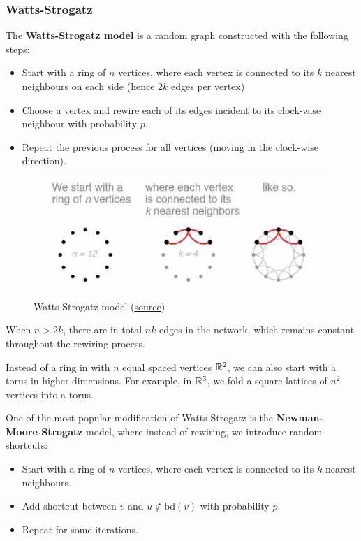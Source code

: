 \documentclass{article}
\begin{document}
\subsubsection{Watts-Strogatz}
The \textbf{Watts-Strogatz model} is a random graph constructed with the following steps:
\begin{itemize}
    \item Start with a ring of $n$ vertices, where each vertex is connected to its $k$ nearest neighbours on each side (hence $2k$ edges per vertex)
    \item Choose a vertex and rewire each of its edges incident to its clock-wise neighbour with probability $p$.
    \item Repeat the previous process for all vertices (moving in the clock-wise direction).
\end{itemize}

\begin{figure}[H]
    \centering
    \includegraphics[width=0.5\linewidth]{figures/strogatz.png}
    \caption{Watts-Strogatz model (\href{https://www.kth.se}{source})} %
    \label{fig:watts-strogatz}
\end{figure}

When $n>2k$, there are in total $nk$ edges in the network, which remains constant throughout the rewiring process.

\begin{remark}
    Instead of a ring in with $n$ equal spaced vertices $\mathbb{R}^2$, we can also start with a torus in higher dimensions. For example, in $\mathbb{R}^3$, we fold a square lattices of $n^2$ vertices into a torus.
\end{remark}  

One of the most popular modification of Watts-Strogatz is the \textbf{Newman-Moore-Strogatz} model, where instead of rewiring, we introduce random shortcuts:
\begin{itemize}
    \item Start with a ring of $n$ vertices, where each vertex is connected to its $k$ nearest neighbours.
    \item Add shortcut between $v$ and $u\notin \text{bd}(v)$ with probability $p$.
    \item Repeat for some iterations.
\end{itemize}
\end{document}

